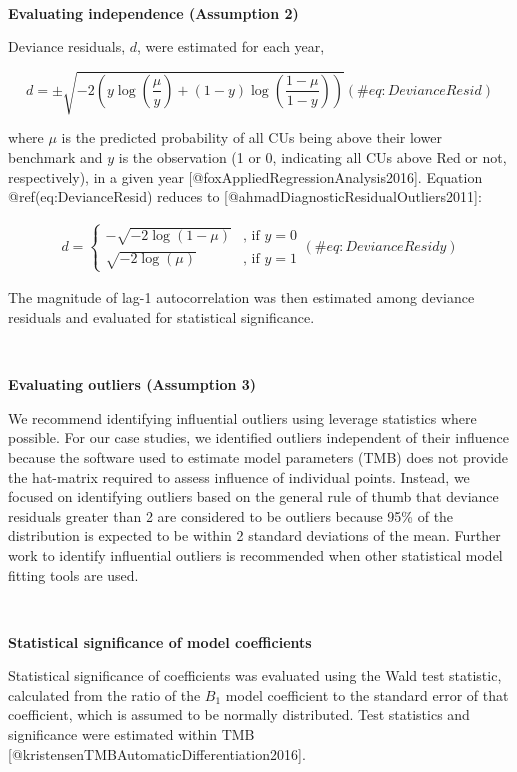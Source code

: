 \documentclass[
]{article}
\begin{document}
~

\textbf{Evaluating independence (Assumption 2)}

Deviance residuals, \(d\), were estimated for each year,

\begin{equation}
   d = \pm \sqrt { -2 ( y \log(\frac{\mu}{y}) + (1-y)\log(\frac{1-\mu}{1-y}) ) }
   (\#eq:DevianceResid)
\end{equation}

where \(\mu\) is the predicted probability of all CUs being above their
lower benchmark and \(y\) is the observation (1 or 0, indicating all CUs
above Red or not, respectively), in a given year
{[}@foxAppliedRegressionAnalysis2016{]}. Equation @ref(eq:DevianceResid)
reduces to {[}@ahmadDiagnosticResidualOutliers2011{]}:

\begin{align}
d = 
\begin{cases}
  - \sqrt { -2 \log(1-\mu) } & \text{, if } y = 0 \\
  \sqrt { -2 \log(\mu)  }  &\text{, if } y = 1
\end{cases}
  (\#eq:DevianceResidy)
\end{align}

The magnitude of lag-1 autocorrelation was then estimated among deviance
residuals and evaluated for statistical significance.

~

\textbf{Evaluating outliers (Assumption 3)}

We recommend identifying influential outliers using leverage statistics
where possible. For our case studies, we identified outliers independent
of their influence because the software used to estimate model
parameters (TMB) does not provide the hat-matrix required to assess
influence of individual points. Instead, we focused on identifying
outliers based on the general rule of thumb that deviance residuals
greater than 2 are considered to be outliers because 95\% of the
distribution is expected to be within 2 standard deviations of the mean.
Further work to identify influential outliers is recommended when other
statistical model fitting tools are used.

~

\textbf{Statistical significance of model coefficients}

Statistical significance of coefficients was evaluated using the Wald
test statistic, calculated from the ratio of the \(B_1\) model
coefficient to the standard error of that coefficient, which is assumed
to be normally distributed. Test statistics and significance were
estimated within TMB {[}@kristensenTMBAutomaticDifferentiation2016{]}.
\end{document}
